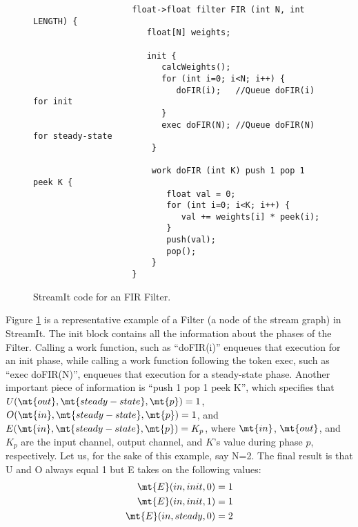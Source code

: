 
\begin{figure}[t]
\begin{verbatim}
                    float->float filter FIR (int N, int LENGTH) {
                       float[N] weights;

                       init {
                          calcWeights();
                          for (int i=0; i<N; i++) {
                             doFIR(i);   //Queue doFIR(i) for init
                          }
                          exec doFIR(N); //Queue doFIR(N) for steady-state
                        }

                        work doFIR (int K) push 1 pop 1 peek K {
                           float val = 0;
                           for (int i=0; i<K; i++) {
                              val += weights[i] * peek(i);
                           }
                           push(val);
                           pop();
                        }
                    }
\end{verbatim}
\caption{StreamIt code for an FIR Filter.
\protect\label{fig:fir}}
\end{figure}

Figure \ref{fig:fir} is a representative example of a Filter (a node
of the stream graph) in StreamIt. The init block contains all the
information about the phases of the Filter.  Calling a work function,
such as ``doFIR(i)'' enqueues that execution for an init phase, while
calling a work function following the token exec, such as ``exec
doFIR(N)'', enqueues that execution for a steady-state phase. Another
important piece of information is ``push 1 pop 1 peek K'', which
specifies that $U(\mt{out},\mt{steady-state},\mt{p})=1$,
$O(\mt{in},\mt{steady-state},\mt{p})=1$, and
$E(\mt{in},\mt{steady-state},\mt{p})=K_p$, where $\mt{in}$,
$\mt{out}$, and $K_p$ are the input channel, output channel, and $K$'s
value during phase $p$, respectively. Let us, for the sake of this
example, say N=2. The final result is that U and O always equal 1 but
E takes on the following values:
\begin{align}
\mt{E}(in,init,0)&=1\nonumber\\
\mt{E}(in,init,1)&=1\nonumber\\
\mt{E}(in,steady,0)&=2\nonumber
\end{align}

